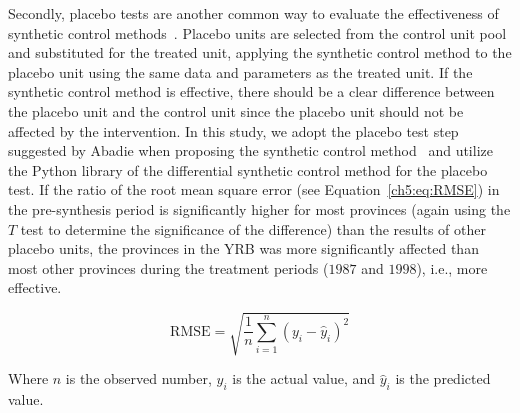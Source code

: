 Secondly, placebo tests are another common way to evaluate the effectiveness of synthetic control methods~\cite{abadie2010}.
Placebo units are selected from the control unit pool and substituted for the treated unit, applying the synthetic control method to the placebo unit using the same data and parameters as the treated unit.
If the synthetic control method is effective, there should be a clear difference between the placebo unit and the control unit since the placebo unit should not be affected by the intervention.
In this study, we adopt the placebo test step suggested by Abadie when proposing the synthetic control method~\cite{abadie2010} and utilize the Python library of the differential synthetic control method for the placebo test.
If the ratio of the root mean square error (see Equation~\ref{ch5:eq:RMSE}) in the pre-synthesis period is significantly higher for most provinces (again using the $T$ test to determine the significance of the difference) than the results of other placebo units, the provinces in the YRB was more significantly affected than most other provinces during the treatment periods ($1987$ and $1998$), i.e., more effective.

\begin{equation}
    \label{ch5:eq:RMSE}
    \text{RMSE} = \sqrt{\frac{1}{n}\sum_{i=1}^{n}{(y_i-\hat{y}_i)}^2}
\end{equation}

Where $n$ is the observed number, $y_i$ is the actual value, and $\hat{y}_i$ is the predicted value.
